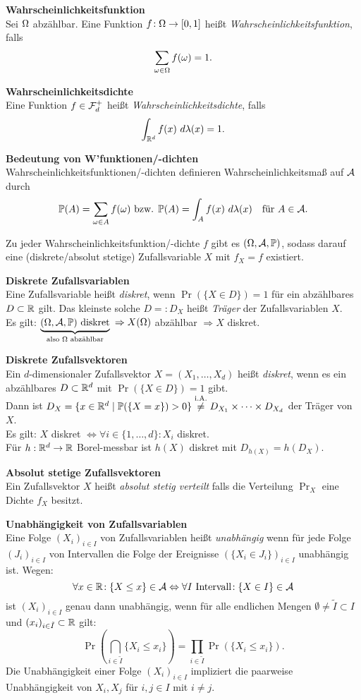 \textbf{Wahrscheinlichkeitsfunktion}\\
Sei $\Omega$ abzählbar.
Eine Funktion $f\!: \Omega \to [0,1]$ heißt
\textit{Wahrscheinlichkeitsfunktion}, falls
\[
  \sum_{\omega\in\Omega} f(\omega) = 1.
\]

\textbf{Wahrscheinlichkeitsdichte}\\
Eine Funktion $f\in\mathcal{F}_d^+$ heißt \textit{Wahrscheinlichkeitsdichte},
falls
\[
  \int_{\mathbb{R}^d} f(x)~d\lambda(x) = 1.
\]

\textbf{Bedeutung von W'funktionen/-dichten}\\
Wahrscheinlichkeitsfunktionen/-dichten definieren Wahrscheinlichkeitsmaß auf
$\mathcal{A}$ durch
\[
  \mathbb{P}(A) = \sum_{\omega \in A} f(\omega) \text{ bzw. } \mathbb{P}(A) = \int_A f(x)~d\lambda(x)
  \quad \text{für } A\in\mathcal{A}.
\]

Zu jeder Wahrscheinlichkeitsfunktion/-dichte $f$ gibt es $(\Omega,\mathcal{A},\mathbb{P})$, sodass
darauf eine (diskrete/absolut stetige) Zufallsvariable $X$ mit
$f_X = f$ existiert.

\textbf{Diskrete Zufallsvariablen}\\
Eine Zufallsvariable heißt \textit{diskret}, wenn $\Pr(\{X \in D\}) = 1$
für ein abzählbares $D\subset\mathbb{R}$ gilt.
Das kleinste solche $D =: D_X$ heißt \textit{Träger} der Zufallsvariablen $X$.\\
Es gilt:
$\underbrace{(\Omega,\mathcal{A},\mathbb{P}) \text{ diskret}}_{\text{also $\Omega$ abzählbar}}$
$\Rightarrow X(\Omega)$ abzählbar $\Rightarrow X$ diskret.

\textbf{Diskrete Zufallsvektoren}\\
Ein $d$-dimensionaler Zufallsvektor $X = (X_1,\ldots,X_d)$ heißt \textit{diskret},
wenn es ein abzählbares $D\subset\mathbb{R}^d$ mit $\Pr(\{X \in D\}) = 1$ gibt.\\
Dann ist $D_X = \{x\in\mathbb{R}^d \mid \mathbb{P}(\{X=x\})>0\}
\overset{\text{i.A.}}{\neq} D_{X_1} \times\cdots\times D_{X_d}$
der Träger von $X$.\\
Es gilt: $X$ diskret $\Leftrightarrow \forall i\in\{1,\ldots,d\}\!: X_i$ diskret.\\
Für $h:\mathbb{R}^d\to\mathbb{R}$ Borel-messbar ist $h(X)$ diskret mit $D_{h(X)} = h(D_X)$.

\textbf{Absolut stetige Zufallsvektoren}\\
Ein Zufallsvektor $X$ heißt \textit{absolut stetig verteilt} falls die
Verteilung $\Pr_X$ eine Dichte $f_X$ besitzt.

\textbf{Unabhängigkeit von Zufallsvariablen}\\
Eine Folge $(X_i)_{i \in I}$ von Zufallsvariablen heißt \textit{unabhängig} wenn
für jede Folge $(J_i)_{i \in I}$ von Intervallen die Folge der Ereignisse
$(\{X_i \in J_i\})_{i \in I}$ unabhängig ist.
Wegen:
\[
  \forall x\in\mathbb{R}\!: \{X \leq x\} \in \mathcal{A}
  \Leftrightarrow \forall I \text{ Intervall}\!: \{X \in I\} \in \mathcal{A}
\]
ist $(X_i)_{i \in I}$ genau dann unabhängig, wenn für alle endlichen Mengen
$\emptyset \neq \tilde{I} \subset I$ und
\mbox{$(x_i)_{i\in\tilde{I}}\subset\mathbb{R}$} gilt:
\[
  \Pr\left(\bigcap_{i\in\tilde{I}} \{X_i \leq x_i\}\right)=
  \prod_{i\in\tilde{I}} \Pr(\{X_i \leq x_i\}).
\]
Die Unabhängigkeit einer Folge $(X_i)_{i \in I}$ impliziert die paarweise
Unabhängigkeit von $X_i,X_j$ für $i,j \in I$ mit $i \neq j$.


